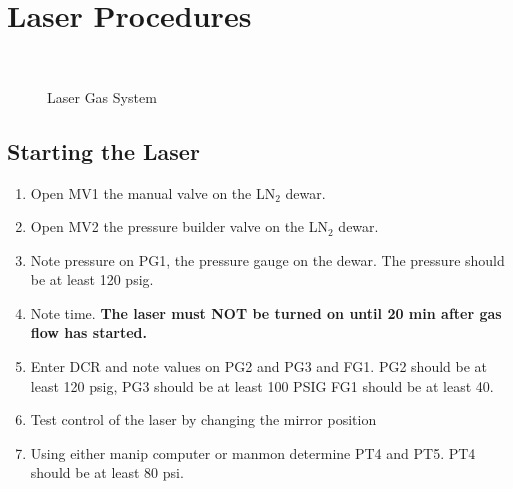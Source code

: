 

\section{Laser Procedures}
   
\begin{figure}[htb]
\begin{center}
\leavevmode
\epsfxsize=7in
~\\
\caption[Laser Gas System]
        {Laser Gas System
        }
\end{center}
\end{figure}
  
  
\subsection{Starting the Laser}
\begin{enumerate}
\item Open MV1 the manual valve on the LN$_2$ dewar.
\item Open MV2 the pressure builder valve on the LN$_2$ dewar.
\item Note pressure on PG1, the pressure gauge on the dewar.
      The pressure should be at least 120 psig.
\item Note time.  {\bf The laser must NOT be turned on until 20 min
       after gas flow has started.}
\item Enter DCR and note values on PG2 and PG3 and FG1.
  PG2 should be at least 120 psig, PG3 should be at least 100 PSIG
  FG1 should be at least 40.
\item Test control of the laser by changing the mirror position
\item Using either manip computer or manmon determine PT4 and PT5.
  PT4 should be at least 80 psi.
\end{enumerate}
  
